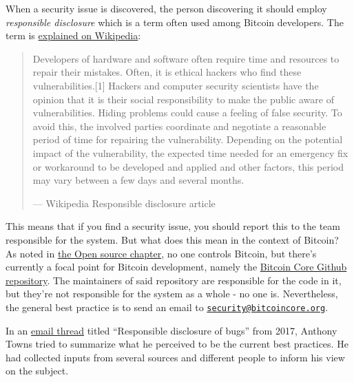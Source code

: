 When a security issue is discovered, the person discovering it should
employ \emph{responsible disclosure} which is a term often used among
Bitcoin developers. The term is
\href{https://en.wikipedia.org/wiki/Coordinated_vulnerability_disclosure}{explained
on Wikipedia}:

\begin{quote}
Developers of hardware and software often require time and resources to
repair their mistakes. Often, it is ethical hackers who find these
vulnerabilities.{[}1{]} Hackers and computer security scientists have
the opinion that it is their social responsibility to make the public
aware of vulnerabilities. Hiding problems could cause a feeling of false
security. To avoid this, the involved parties coordinate and negotiate a
reasonable period of time for repairing the vulnerability. Depending on
the potential impact of the vulnerability, the expected time needed for
an emergency fix or workaround to be developed and applied and other
factors, this period may vary between a few days and several months.

---  Wikipedia Responsible disclosure article
\end{quote}

This means that if you find a security issue, you should report this to
the team responsible for the system. But what does this mean in the
context of Bitcoin? As noted in
\protect\hyperlink{softwaremaintenance}{the Open source chapter}, no one
controls Bitcoin, but there's currently a focal point for Bitcoin
development, namely the
\href{https://github.com/bitcoin/bitcoin}{Bitcoin Core Github
repository}. The maintainers of said repository are responsible for the
code in it, but they're not responsible for the system as a whole - no
one is. Nevertheless, the general best practice is to send an email to
\href{mailto:security@bitcoincore.org}{\nolinkurl{security@bitcoincore.org}}.

In an
\href{https://lists.linuxfoundation.org/pipermail/bitcoin-dev/2017-September/015002.html}{email
thread} titled ``Responsible disclosure of bugs'' from 2017, Anthony
Towns tried to summarize what he perceived to be the current best
practices. He had collected inputs from several sources and different
people to inform his view on the subject.

